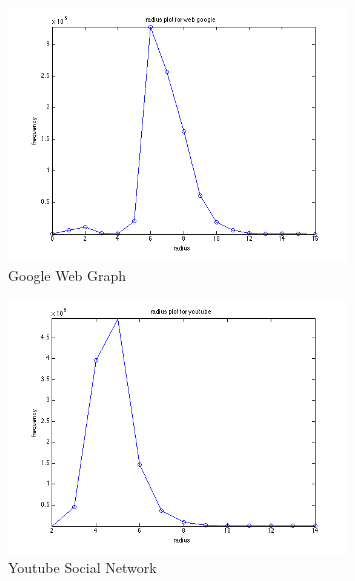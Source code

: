 \begin{figure}[!htbf]
\begin{center}
     \includegraphics[width=0.8\textwidth]{FIG/t4_google.png} 
\caption{Google Web Graph}
\label{t4:4}
\end{center}
\end{figure}


\begin{figure}[!htbf]
\begin{center}
     \includegraphics[width=0.8\textwidth]{FIG/t4_youtube.png} 
\caption{Youtube Social Network}
\label{t4:5}
\end{center}
\end{figure}

